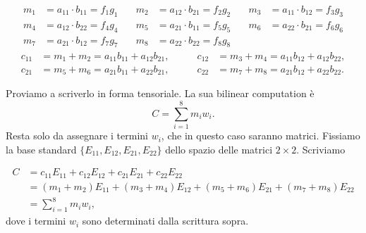 \begin{equation}
	\label{eq:mult_222_m_i}
	\begin{aligned}
		m_1 & = a_{11} \cdot b_{11} = f_1 g_1 & \quad m_2 & = a_{12} \cdot b_{21} = f_2g_2 & \quad m_3 & = a_{11}
		\cdot b_{12} = f_3g_3                                                                                     \\
		m_4 & = a_{12} \cdot b_{22} = f_4g_4  & \quad m_5 & = a_{21} \cdot b_{11} = f_5g_5 & \quad m_6 & = a_{22}
		\cdot b_{21} = f_6g_6                                                                                     \\
		m_7 & = a_{21} \cdot b_{12} = f_7g_7  & \quad m_8 & = a_{22} \cdot b_{22} = f_8g_8 &           &
	\end{aligned}
\end{equation}
\[
	\begin{aligned}
		c_{11} & = m_1 + m_2 = a_{11}b_{11} + a_{12}b_{21}, & \qquad  c_{12} & = m_3 + m_4 = a_{11}b_{12} +
		a_{12}b_{22},                                                                                       \\
		c_{21} & = m_5 + m_6 = a_{21}b_{11} + a_{22}b_{21}, & \qquad  c_{22} & = m_7 + m_8 = a_{21}b_{12} +
		a_{22}b_{22}.
	\end{aligned}
\]


Proviamo a scriverlo in forma tensoriale. La sua bilinear computation è
\begin{equation*}
	C = \sum_{i=1}^8 m_{i}w_{i}.
\end{equation*}
Resta solo da assegnare i termini $ w_{i} $, che in questo caso saranno matrici. Fissiamo la
base standard $ \{E_{11}, E_{12}, E_{21}, E_{22}\}  $ dello spazio delle matrici $ 2\times 2 $. Scriviamo

\begin{equation*}
	\begin{aligned}
		C & = c_{11}E_{11} + c_{12}E_{12} + c_{21}E_{21} + c_{22}E_{22}                  \\
		  & = (m_1 + m_2)E_{11} + (m_3 +m_4)E_{12} + (m_5+m_6)E_{21} + (m_7 + m_8)E_{22} \\
		  & = \sum_{i=1}^8 m_{i}w_{i},
	\end{aligned}
\end{equation*}
dove i termini $ w_{i} $ sono determinati dalla scrittura sopra.

